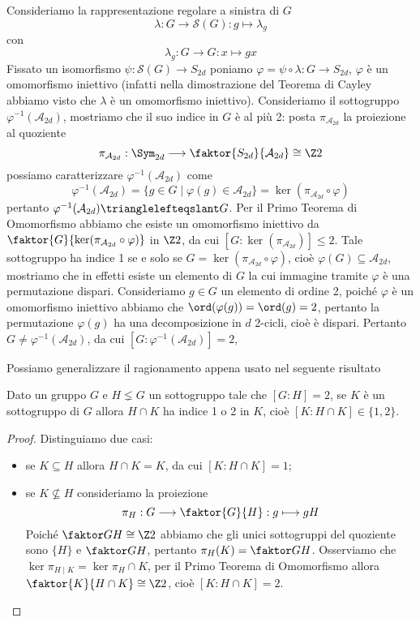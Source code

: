 \documentclass[11pt]{scrartcl}
\begin{document}
	\begin{soln}
		Consideriamo la rappresentazione regolare a sinistra di $G$
		\[
		\lambda: G \longrightarrow \mathcal{S}(G) : g\longmapsto \lambda_g
		\]
		con
		\[
		\lambda_g : G\longrightarrow G : x\longmapsto gx
		\]
		Fissato un isomorfismo $\psi: \mathcal{S}(G) \longrightarrow S_{2d}$ poniamo
		$\varphi = \psi\circ\lambda :G\longrightarrow S_{2d}$, $\varphi$ è 
		un omomorfismo iniettivo (infatti nella dimostrazione del Teorema di Cayley
		abbiamo visto che $\lambda$ è un omomorfismo iniettivo). Consideriamo 
		il sottogruppo $\varphi^{-1}(\mathcal{A}_{2d})$, mostriamo che il suo 
		indice in $G$ è al più 2:
		posta $\pi_{\mathcal{A}_{2d}}$ la proiezione al quoziente
		\[
		\pi_{\mathcal{A}_{2d}}:\Sym_{2d}\longrightarrow \faktor{S_{2d}}{\mathcal{A}_{2d}}\cong \Z2
		\]
		possiamo caratterizzare $\varphi^{-1}(\mathcal{A}_{2d})$ come
		\[
		\varphi^{-1}(\mathcal{A}_{2d}) = \{g \in G \mid \varphi(g) \in \mathcal{A}_{2d}\}
		= \ker (\pi_{\mathcal{A}_{2d}}\circ\varphi)
		\]
		pertanto $\varphi^{-1}(\mathcal{A}_{2d})\trianglelefteqslant G$. 
		Per il Primo Teorema di Omomorfismo abbiamo che esiste un omomorfismo
		iniettivo da $\faktor{G}{\ker(\pi_{\mathcal{A}_{2d}}\circ\varphi)}$ in
		$\Z2$, da cui $[G:\ker(\pi_{\mathcal{A}_{2d}})] \leq 2$. Tale 
		sottogruppo ha indice 1 se e solo se $G = \ker(\pi_{\mathcal{A}_{2d}}\circ\varphi)$,
		cioè $\varphi(G) \subseteq \mathcal{A}_{2d}$, mostriamo che in effetti esiste 
		un elemento di $G$ la cui immagine tramite $\varphi$ è una permutazione 
		dispari. Consideriamo $g \in G$ un elemento di ordine 2, poiché $\varphi$
		è un omomorfismo iniettivo abbiamo che $\ord(\varphi(g)) = \ord(g) = 2$,
		pertanto la permutazione $\varphi(g)$ ha una decomposizione in $d$ 2-cicli,
		cioè è dispari. Pertanto $G \neq \varphi^{-1}(\mathcal{A}_{2d})$,
		da cui $[G: \varphi^{-1}(\mathcal{A}_{2d})] = 2$,
	\end{soln}
	
	Possiamo generalizzare il ragionamento appena usato nel seguente risultato
	
	\begin{proposition}
		\label{prop1.49}
		Dato un gruppo $G$ e $H\lneq G$ un sottogruppo tale che $[G:H] = 2$, se
		$K$ è un sottogruppo di $G$ allora $H\cap K$ ha indice 1 o 2 in $K$,
		cioè $[K:H\cap K] \in \{1, 2\}$.
	\end{proposition}
	
	\begin{proof}
		Distinguiamo due casi:
		\begin{itemize}
			\item se $K \subseteq H$ allora $H \cap K = K$, da cui $[K:H\cap K] = 1$;
			\item se $K \nsubseteq H$ consideriamo la proiezione 
			\[
			\pi_H: G\longrightarrow \faktor{G}{H} :g \longmapsto gH
			\]
			Poiché $\faktor G H \cong \Z2$ abbiamo che gli unici sottogruppi 
			del quoziente sono $\{H\}$ e $\faktor G H$, pertanto 
			$\pi_H(K) = \faktor G H$. Osserviamo che $\ker\pi_{H\mid K}
			= \ker \pi_H \cap K$, per il Primo Teorema di Omomorfismo allora 
			$\faktor{K}{H\cap K} \cong \Z2$, cioè $[K:H\cap K] = 2$.
		\end{itemize}
	\end{proof}
	
\end{document}
